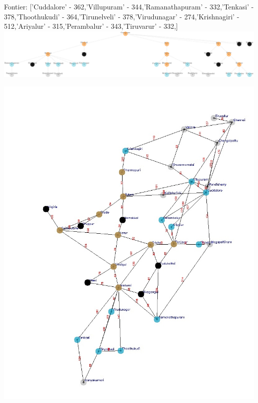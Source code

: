 \documentclass[xcolor=table]{beamer}
\begin{document}
\begin{frame}
  { \tiny Fontier: ['Cuddalore' - 362,'Villupuram' - 344,'Ramanathapuram' - 332,'Tenkasi' - 378,'Thoothukudi' - 364,'Tirunelveli' - 378,'Virudunagar' - 274,'Krishnagiri' - 512,'Ariyalur' - 315,'Perambalur' - 343,'Tiruvarur' - 332,]}
  \includegraphics[width=1\textwidth]{../UCSNodes/23-1.png}
  \begin{center}
    \includegraphics[height=0.6\textheight]{../UCSoutput/tamilUCS21.jpg}
  \end{center}
\end{frame}
\end{document}
